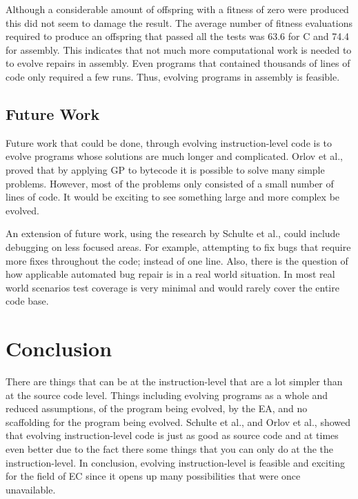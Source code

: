 \documentclass{sig-alternate}
\begin{document}
Although a considerable amount of offspring with a fitness of zero were produced this did not seem to damage the result. The average number of fitness evaluations required to produce an offspring that passed all the tests was 63.6 for C and 74.4 for assembly. This indicates that not much more computational work is needed to to evolve repairs in assembly. Even programs that contained thousands of lines of code only required a few runs. Thus, evolving programs in assembly is feasible.
 

\subsection{Future Work}


Future work that could be done, through evolving instruction-level code is to evolve programs whose solutions are much longer and complicated. Orlov et al.,~\cite{FINCH:2011} proved that by applying GP to bytecode it is possible to solve many simple problems. However, most of the problems only consisted of a small number of lines of code. It would be exciting to see something large and more complex be evolved.

An extension of future work, using the research by Schulte et al., could include debugging on less focused areas. For example, attempting to fix bugs that require more fixes throughout the code; instead of one line. Also, there is the question of how applicable automated bug repair is in a real world situation. In most real world scenarios test coverage is very minimal and would rarely cover the entire code base.


\section{Conclusion}
There are things that can be at the instruction-level that are a lot simpler than at the source code level. Things including evolving programs as a whole and reduced assumptions, of the program being evolved, by the EA, and no scaffolding for the program being evolved. Schulte et al., and Orlov et al., showed that evolving instruction-level code is just as good as source code and at times even better due to the fact there some things that you can only do at the the instruction-level. In conclusion, evolving instruction-level is feasible and exciting for the field of EC since it opens up many possibilities that were once unavailable.
\end{document}
